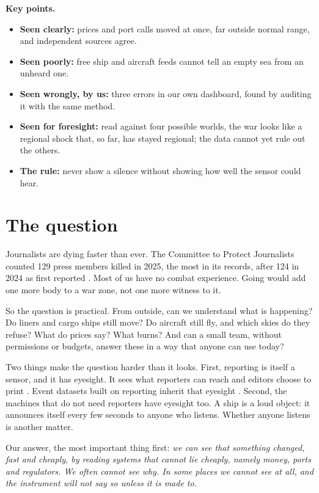 \documentclass[10pt,twocolumn,letterpaper]{article}
\begin{document}
\smallskip\noindent\textbf{Key points.}
\begin{itemize}
\item \textbf{Seen clearly:} prices and port calls moved at once, far outside normal range, and independent sources agree.
\item \textbf{Seen poorly:} free ship and aircraft feeds cannot tell an empty sea from an unheard one.
\item \textbf{Seen wrongly, by us:} three errors in our own dashboard, found by auditing it with the same method.
\item \textbf{Seen for foresight:} read against four possible worlds, the war looks like a regional shock that, so far, has stayed regional; the data cannot yet rule out the others.
\item \textbf{The rule:} never show a silence without showing how well the sensor could hear.
\end{itemize}

\section{The question}
Journalists are dying faster than ever. The Committee to Protect Journalists counted 129 press members killed in 2025, the most in its records, after 124 in 2024 as first reported \citep{cpj2026report,cpj2025report}. Most of us have no combat experience. Going would add one more body to a war zone, not one more witness to it.

So the question is practical. From outside, can we understand what is happening? Do liners and cargo ships still move? Do aircraft still fly, and which skies do they refuse? What do prices say? What burns? And can a small team, without permissions or budgets, answer these in a way that anyone can use today?

Two things make the question harder than it looks. First, reporting is itself a sensor, and it has eyesight. It sees what reporters can reach and editors choose to print \citep{earl2004newspaper,weidmann2016reporting}. Event datasets built on reporting inherit that eyesight \citep{raleigh2010acled,sundberg2013ucdp,leetaru2013gdelt}. Second, the machines that do not need reporters have eyesight too. A ship is a loud object: it announces itself every few seconds to anyone who listens. Whether anyone listens is another matter.

Our answer, the most important thing first: \emph{we can see that something changed, fast and cheaply, by reading systems that cannot lie cheaply, namely money, ports and regulators. We often cannot see why. In some places we cannot see at all, and the instrument will not say so unless it is made to.}
\end{document}
